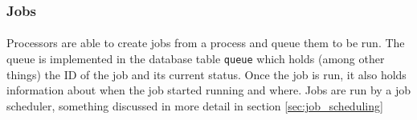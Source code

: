 \subsubsection{Jobs}
\label{sec:model_jobs}
\paragraph{}
Processors are able to create jobs from a process and queue them to be run. The queue is implemented in the database table \texttt{queue} which holds (among other things) the ID of the job and its current status. Once the job is run, it also holds information about when the job started running and where. Jobs are run by a job scheduler, something discussed in more detail in section \ref{sec:job_scheduling}

